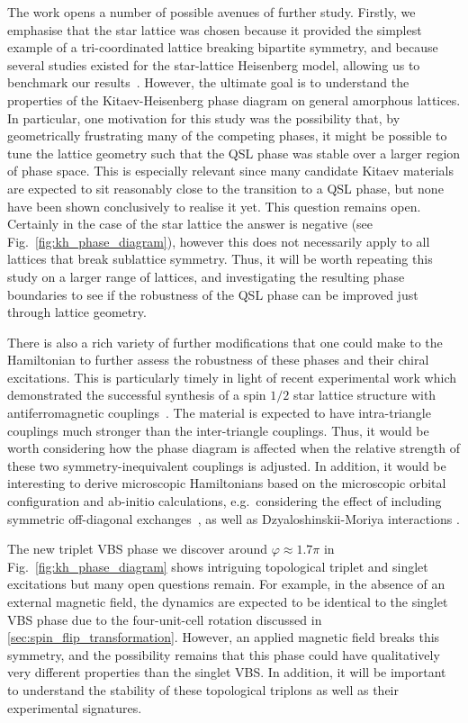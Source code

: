 The work opens a number of possible avenues of further study. Firstly, we emphasise that the star lattice was chosen because it provided the simplest example of a tri-coordinated lattice breaking bipartite symmetry, and because several studies existed for the star-lattice Heisenberg model, allowing us to benchmark our results~\cite{richter_absence_2004,choy_classification_2009,yang_competing_2010, jahromi_spin-frac12_2018,jahromi_infinite_2018,ran_emergent_2018}. However, the ultimate goal is to understand the properties of the Kitaev-Heisenberg phase diagram on general amorphous lattices. In particular, one motivation for this study was the possibility that, by geometrically frustrating many of the competing phases, it might be possible to tune the lattice geometry such that the QSL phase was stable over a larger region of phase space. This is especially relevant since many candidate Kitaev materials are expected to sit reasonably close to the transition to a QSL phase, but none have been shown conclusively to realise it yet. This question remains open. Certainly in the case of the star lattice the answer is negative (see Fig.~\ref{fig:kh_phase_diagram}), however this does not necessarily apply to all lattices that break sublattice symmetry. Thus, it will be worth repeating this study on a larger range of lattices, and investigating the resulting phase boundaries to see if the robustness of the QSL phase can be improved just through lattice geometry.

There is also a rich variety of further modifications that one could make to the Hamiltonian to further assess the robustness of these phases and their chiral excitations. This is particularly timely in light of recent experimental work which demonstrated the successful synthesis of a spin $1/2$ star lattice structure with antiferromagnetic couplings~\cite{sorolla_synthesis_2020}. The material is expected to have intra-triangle couplings much stronger than the inter-triangle couplings. Thus, it would be worth considering how the phase diagram is affected when the relative strength of these two symmetry-inequivalent couplings is adjusted. In addition, it would be interesting to derive microscopic Hamiltonians based on the microscopic orbital configuration and ab-initio calculations, e.g.~considering the effect of including symmetric off-diagonal exchanges~\cite{rau_generic_2014,knolle_dynamics_2018}, as well as Dzyaloshinskii-Moriya interactions \cite{kim_realization_2016, zhang_interplay_2021}.

The new triplet VBS phase we discover around $\varphi \approx 1.7\pi$ in Fig.~\ref{fig:kh_phase_diagram} shows intriguing topological triplet and singlet excitations but many open questions remain. For example, in the absence of an external magnetic field, the dynamics are expected to be identical to the singlet VBS phase due to the four-unit-cell rotation discussed in \textsection\ref{sec:spin_flip_transformation}. However, an applied magnetic field breaks this symmetry, and the possibility remains that this phase could have qualitatively very different properties than the singlet VBS. In addition, it will be important to understand the stability of these topological triplons as well as their experimental signatures.
